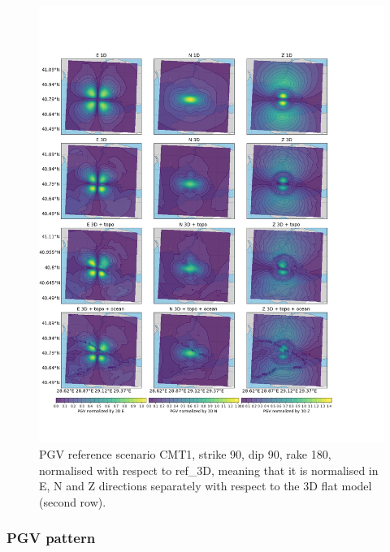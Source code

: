 \documentclass[../Text/00main.tex]{subfiles}
\begin{document}
\begin{figure}[htp!]
    \centering
    \includegraphics[width=1\linewidth, trim = 0cm 3cm 5.5cm 4cm, clip]{images_results/Ref_scenarios_normalized_sc1.png}
    \caption{PGV reference scenario CMT1, strike 90, dip 90, rake 180, normalised with respect to ref\_3D, meaning that it is normalised in E, N and Z directions separately with respect to the 3D flat model (second row).}
    \label{fig:ref_CMT1}
\end{figure}

\subsubsection{PGV pattern}
\end{document}
